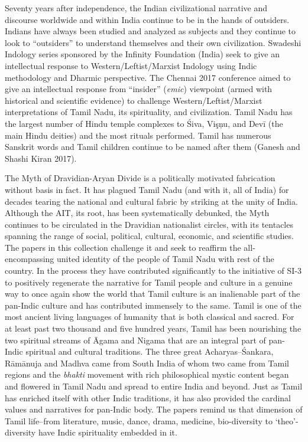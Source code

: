 Seventy years after independence, the Indian civilizational narrative and discourse worldwide and within India continue to be in the hands of outsiders. Indians have always been studied and analyzed as subjects and they continue to look to “outsiders” to understand themselves and their own civilization. Swadeshi Indology series sponsored by the Infinity Foundation (India) seek to give an intellectual response to Western/Leftist/Marxist Indology using Indic methodology and Dharmic perspective. The Chennai 2017 conference aimed to give an intellectual response from “insider” (\textit{emic}) viewpoint (armed with historical and scientific evidence) to challenge Western/Leftist/Marxist interpretations of Tamil Nadu, its spirituality, and civilization. Tamil Nadu has the largest number of Hindu temple complexes to Śiva, Vişņu, and Devī (the main Hindu deities) and the most rituals performed. Tamil has numerous Sanskrit words and Tamil children continue to be named after them (Ganesh and Shashi Kiran 2017).

The Myth of Dravidian-Aryan Divide is a politically motivated fabrication without basis in fact. It has plagued Tamil Nadu (and with it, all of India) for decades tearing the national and cultural fabric by striking at the unity of India. Although the AIT, its root, has been systematically debunked, the Myth continues to be circulated in the Dravidian nationalist circles, with its tentacles spanning the range of social, political, cultural, economic, and scientific studies. The papers in this collection challenge it and seek to reaffirm the all-encompassing united identity of the people of Tamil Nadu with rest of the country. In the process they have contributed significantly to the initiative of SI-3 to positively regenerate the narrative for Tamil people and culture in a genuine way to once again show the world that Tamil culture is an inalienable part of the pan-Indic culture and has contributed immensely to the same. Tamil is one of the most ancient living languages of humanity that is both classical and sacred. For at least past two thousand and five hundred years, Tamil has been nourishing the two spiritual streams of Āgama and Nigama that are an integral part of pan-Indic spiritual and cultural traditions. The three great Acharyas–Śankara, Rāmānuja and Madhva came from South India of whom two came from Tamil regions and the \textit{bhakti} movement with rich philosophical mystic content began and flowered in Tamil Nadu and spread to entire India and beyond. Just as Tamil has enriched itself with other Indic traditions, it has also provided the cardinal values and narratives for pan-Indic body. The papers remind us that dimension of Tamil life--from literature, music, dance, drama, medicine, bio-diversity to ‘theo’-diversity have Indic spirituality embedded in it.

